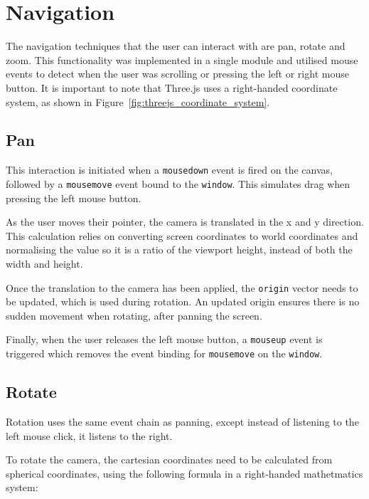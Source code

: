 \section{Navigation} {
\label{sec:navigation}

	The navigation techniques that the user can interact with are pan, rotate and zoom. This functionality was implemented in a single module and utilised mouse events to detect when the user was scrolling or pressing the left or right mouse button. It is important to note that Three.js uses a right-handed coordinate system, as shown in Figure~\ref{fig:threejs_coordinate_system}.

	

	\subsection{Pan} {
	\label{sec:pan}

		This interaction is initiated when a \texttt{mousedown} event is fired on the canvas, followed by a \texttt{mousemove} event bound to the \texttt{window}. This simulates drag when pressing the left mouse button.

		As the user moves their pointer, the camera is translated in the x and y direction. This calculation relies on converting screen coordinates to world coordinates and normalising the value so it is a ratio of the viewport height, instead of both the width and height.

		Once the translation to the camera has been applied, the \texttt{origin} vector needs to be updated, which is used during rotation. An updated origin ensures there is no sudden movement when rotating, after panning the screen.

		Finally, when the user releases the left mouse button, a \texttt{mouseup} event is triggered which removes the event binding for \texttt{mousemove} on the \texttt{window}. 

	}

	\subsection{Rotate} {
	\label{sec:rotate}

		Rotation uses the same event chain as panning, except instead of listening to the left mouse click, it listens to the right.

		To rotate the camera, the cartesian coordinates need to be calculated from spherical coordinates, using the following formula in a right-handed mathetmatics system:

}}
